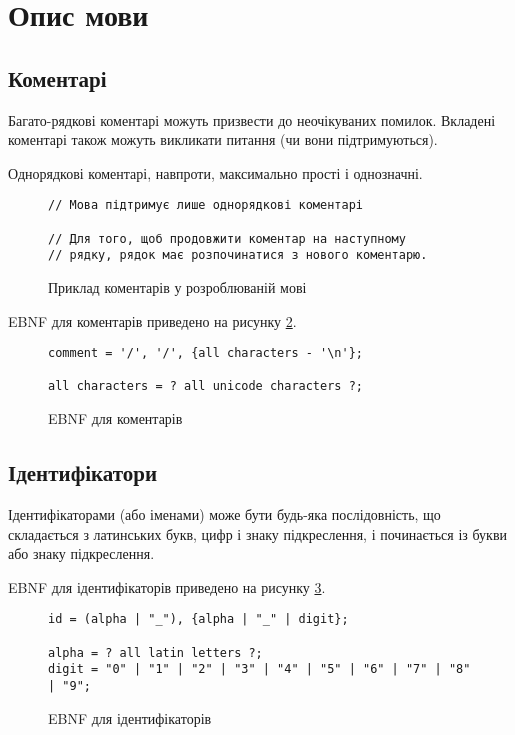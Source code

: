 \documentclass[main.tex]{subfiles}
\begin{document}
\section{Опис мови}
\newcommand{\deftype}[1]{\textbf{\code{#1}}}
\newcommand{\typeitem}[1]{\item \deftype{#1}.}

\FloatBarrier
\subsection{Коментарі}
Багато-рядкові коментарі можуть призвести до неочікуваних помилок.
Вкладені коментарі також можуть викликати питання (чи вони підтримуються).

Однорядкові коментарі, навпроти, максимально прості і однозначні.

\begin{figure}[h]
  \centering
  \begin{verbatim}
// Мова підтримує лише однорядкові коментарі

// Для того, щоб продовжити коментар на наступному
// рядку, рядок має розпочинатися з нового коментарю.
  \end{verbatim}
  \caption{Приклад коментарів у розроблюваній мові}
  \label{lang:comments}
\end{figure}

EBNF для коментарів приведено на рисунку \ref{ebnf:comment}.

\begin{figure}[h]
  \centering
  \begin{verbatim}
comment = '/', '/', {all characters - '\n'};

all characters = ? all unicode characters ?;
  \end{verbatim}
  \caption{EBNF для коментарів}
  \label{ebnf:comment}
\end{figure}

\FloatBarrier
\subsection{Ідентифікатори}
Ідентифікаторами (або іменами) може бути будь-яка послідовність, що складається з латинських букв, цифр і знаку підкреслення, і починається із букви або знаку підкреслення.

EBNF для ідентифікаторів приведено на рисунку \ref{ebnf:id}.

\begin{figure}[h]
  \centering
  \begin{verbatim}
id = (alpha | "_"), {alpha | "_" | digit};

alpha = ? all latin letters ?;
digit = "0" | "1" | "2" | "3" | "4" | "5" | "6" | "7" | "8" | "9";
  \end{verbatim}
  \caption{EBNF для ідентифікаторів}
  \label{ebnf:id}
\end{figure}
\end{document}
